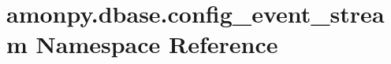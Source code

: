 \hypertarget{namespaceamonpy_1_1dbase_1_1config__event__stream}{\section{amonpy.\-dbase.\-config\-\_\-event\-\_\-stream Namespace Reference}
\label{namespaceamonpy_1_1dbase_1_1config__event__stream}
}
